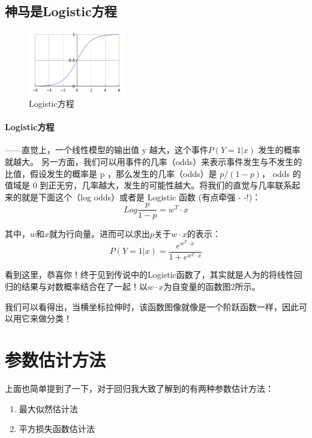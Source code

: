 \documentclass[a4paper, 11pt, hyperref, UTF8]{ctexart} %
\begin{document}


\subsection{神马是Logistic方程}

\begin{figure}[H]
\centering
\includegraphics[width=0.38\textwidth,height=0.38\textwidth]{2.png}
\caption{Logistic方程}
\end{figure}
\paragraph{Logistic方程}——直觉上，一个线性模型的输出值 y 越大，这个事件$ P(Y=1|x) $ 发生的概率就越大。 另一方面，我们可以用事件的几率（odds）来表示事件发生与不发生的比值，假设发生的概率是 p ，那么发生的几率（odds）是 $p/(1-p) $， odds 的值域是 0 到正无穷，几率越大，发生的可能性越大。将我们的直觉与几率联系起来的就是下面这个（log odds）或者是 Logistic 函数 (有点牵强 - -!)：
$$ Log\frac{p}{1-p} =  w^T \cdot x  $$

其中，$w$和$x$就为行向量。进而可以求出$p$关于$w \cdot x$的表示：
$$ P(Y=1|x)  = \frac{e^{w^T \cdot x}}{1+e^{w^T \cdot x}}$$

看到这里，恭喜你！终于见到传说中的Logistic函数了，其实就是人为的将线性回归的结果与对数概率结合在了一起！以$w \cdot x$为自变量的函数图2所示。

我们可以看得出，当横坐标拉伸时，该函数图像就像是一个阶跃函数一样，因此可以用它来做分类！

\section{参数估计方法}

上面也简单提到了一下，对于回归我大致了解到的有两种参数估计方法：
\begin{enumerate}
\item 最大似然估计法
\item 平方损失函数估计法
\end{enumerate}
\end{document}
